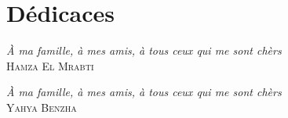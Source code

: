 \chapter*{Dédicaces}

\begin{flushright}
\emph{\`A ma famille, à mes amis, à tous ceux qui me sont chèrs } \\
\textsc{Hamza El Mrabti}\\
\end{flushright}


\begin{flushright}
\emph{\`A ma famille, à mes amis, à tous ceux qui me sont chèrs } \\
\textsc{Yahya Benzha}\\
\end{flushright}




